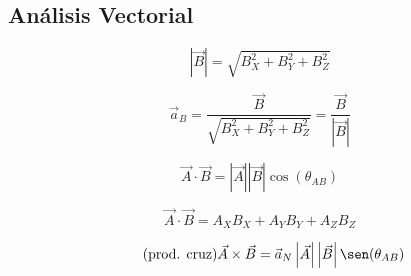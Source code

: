 \documentclass[fontsize=8pt]{scrartcl}
\begin{document}
  \begin{multicols}{3}

    \section*{Análisis Vectorial}

      \begin{equation*}
        \tag{magnitud}
        \left|\vec{B}\right| = \sqrt{B_X^2 + B_Y^2 + B_Z^2}
      \end{equation*}

      \begin{equation*}
        \tag{dirección}
        \vec{a}_B = \frac{\vec{B}}{\sqrt{B_X^2 + B_Y^2 + B_Z^2}} = \frac{\vec{B}}{\left|\vec{B}\right|}
      \end{equation*}

      \begin{equation*}
        \tag{prod. punto}
        \vec{A} \cdot \vec{B} = \left|\vec{A}\right| \left|\vec{B}\right| \cos(\theta_{AB})
      \end{equation*}

      \begin{equation*}
        \tag{prod. punto}
        \vec{A} \cdot \vec{B} = A_X B_X + A_Y B_Y + A_Z B_Z
      \end{equation*}

      \begin{equation*}
        \tag{prod. cruz}
        \vec{A} \times \vec{B} = \vec{a}_N \left|\vec{A}\right| \left|\vec{B}\right| \sen(\theta_{AB})
      \end{equation*}



\end{multicols}
\end{document}
